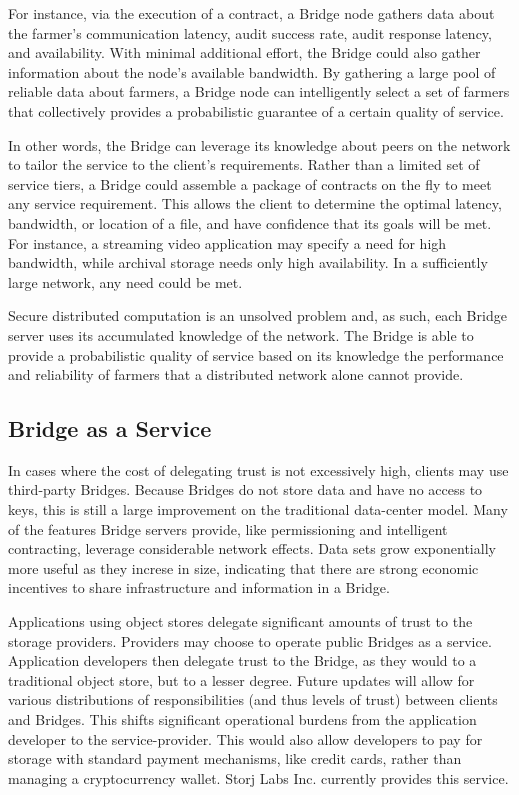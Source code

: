 \documentclass[a4paper,10pt]{article}
\begin{document}
For instance, via the execution of a contract, a Bridge node gathers data about
the farmer’s communication latency, audit success rate, audit response latency,
and availability. With minimal additional effort, the Bridge could also gather
information about the node’s available bandwidth. By gathering a large pool of
reliable data about farmers, a Bridge node can intelligently select a set of
farmers that collectively provides a probabilistic guarantee of a certain
quality of service.

In other words, the Bridge can leverage its knowledge about peers on the network
to tailor the service to the client’s requirements. Rather than a limited set of
service tiers, a Bridge could assemble a package of contracts on the fly to meet
any service requirement. This allows the client to determine the optimal
latency, bandwidth, or location of a file, and have confidence that its goals
will be met. For instance, a streaming video application may specify a need for
high bandwidth, while archival storage needs only high availability. In a
sufficiently large network, any need could be met.

Secure distributed computation is an unsolved problem and, as such, each Bridge
server uses its accumulated knowledge of the network. The Bridge is able to
provide a probabilistic quality of service based on its knowledge the
performance and reliability of farmers that a distributed network alone cannot
provide.

\subsection{Bridge as a Service}
In cases where the cost of delegating trust is not excessively high, clients may
use third-party Bridges. Because Bridges do not store data and have no access to
keys, this is still a large improvement on the traditional data-center model.
Many of the features Bridge servers provide, like permissioning and intelligent
contracting, leverage considerable network effects. Data sets grow exponentially
more useful as they increse in size, indicating that there are strong economic
incentives to share infrastructure and information in a Bridge.

Applications using object stores delegate significant amounts of trust to the
storage providers. Providers may choose to operate public Bridges as a service.
Application developers then delegate trust to the Bridge, as they would to a
traditional object store, but to a lesser degree. Future updates will allow for
various distributions of responsibilities (and thus levels of trust) between
clients and Bridges. This shifts significant operational burdens from the
application developer to the service-provider. This would also allow developers
to pay for storage with standard payment mechanisms, like credit cards, rather
than managing a cryptocurrency wallet. Storj Labs Inc. currently provides this
service.
\end{document}
